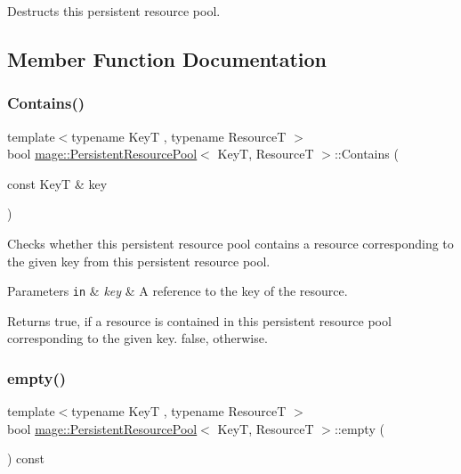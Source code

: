Destructs this persistent resource pool. 

\subsection{Member Function Documentation}
\hypertarget{classmage_1_1_persistent_resource_pool_a92af0c4a200ea217b831d89cfc321557}{}\label{classmage_1_1_persistent_resource_pool_a92af0c4a200ea217b831d89cfc321557} 
\subsubsection{\texorpdfstring{Contains()}{Contains()}}
{\footnotesize\ttfamily template$<$typename KeyT , typename ResourceT $>$ \\
bool \hyperlink{classmage_1_1_persistent_resource_pool}{mage\+::\+Persistent\+Resource\+Pool}$<$ KeyT, ResourceT $>$\+::Contains (\begin{DoxyParamCaption}\item[{const KeyT \&}]{key }\end{DoxyParamCaption})\hspace{0.3cm}{\ttfamily [noexcept]}}

Checks whether this persistent resource pool contains a resource corresponding to the given key from this persistent resource pool.


\begin{DoxyParams}[1]{Parameters}
\mbox{\tt in}  & {\em key} & A reference to the key of the resource. \\
\hline
\end{DoxyParams}
\begin{DoxyReturn}{Returns}
{\ttfamily true}, if a resource is contained in this persistent resource pool corresponding to the given key. {\ttfamily false}, otherwise. 
\end{DoxyReturn}
\hypertarget{classmage_1_1_persistent_resource_pool_a9a5669551c15823b817b3c4716a5a52c}{}\label{classmage_1_1_persistent_resource_pool_a9a5669551c15823b817b3c4716a5a52c} 
\subsubsection{\texorpdfstring{empty()}{empty()}}
{\footnotesize\ttfamily template$<$typename KeyT , typename ResourceT $>$ \\
bool \hyperlink{classmage_1_1_persistent_resource_pool}{mage\+::\+Persistent\+Resource\+Pool}$<$ KeyT, ResourceT $>$\+::empty (\begin{DoxyParamCaption}{ }\end{DoxyParamCaption}) const\hspace{0.3cm}{\ttfamily [noexcept]}}

